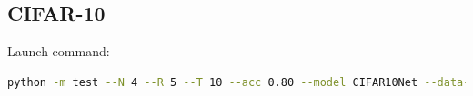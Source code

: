     \subsection{CIFAR-10}
    \label{appendix:accuracy_curves_cifar10}
        Launch command: 
        \begin{lstlisting}[language=Bash, basicstyle=\small, breaklines=true]
python -m test --N 4 --R 5 --T 10 --acc 0.80 --model CIFAR10Net --data-path /scratch/zyi/codeSpace/data --dataset CIFAR10 --batch-size 128 --opt adam --lr 1e-5 --lr-scheduler none --epochs 50 --lr-warmup-epochs 0 --output-dir /scratch/zyi/codeSpace/MultibitSpikes
        \end{lstlisting}

